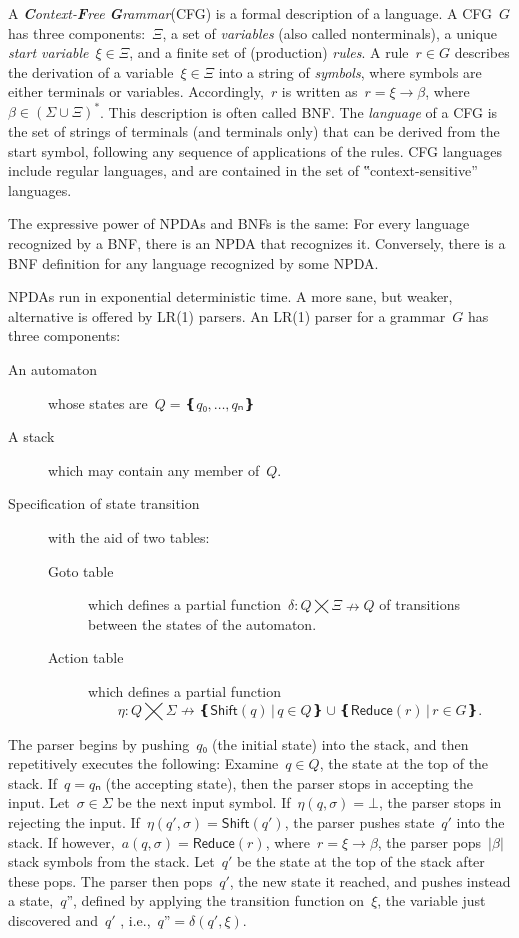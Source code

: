 A \emph{\textbf Context-\textbf Free \textbf Grammar}(CFG) is a formal description of a language.
A CFG~$G$ has three components:~$Ξ$,
a set of \emph{variables} (also called nonterminals), a unique \emph{start variable}~$ξ∈Ξ$, and
  a finite set of (production) \emph{rules}.
A rule~$r∈G$ describes the derivation of a variable~$ξ∈Ξ$ into
  a string of \emph{symbols}, where symbols are either terminals or variables.
Accordingly,~$r$ is written as~$r=ξ→β$, where~$β∈\left(Σ∪Ξ\right)^*$.
This description is often called BNF.
The \emph{language} of a CFG is the set of strings of terminals (and terminals only)
  that can be derived from the start symbol, following any sequence of applications of the rules.
CFG languages include regular languages, and are contained in the set
  of ‟context-sensitive” languages.

The expressive power of NPDAs and BNFs is the same: 
  For every language recognized by a BNF, there is an NPDA that recognizes it. 
Conversely, there is a BNF definition for any language recognized by some NPDA. 

NPDAs run in exponential deterministic time. 
A more sane, but weaker, alternative is offered by LR(1) parsers.  
An LR(1) parser for a grammar~$G$ has three components:
\begin{description}
  \item[An automaton] whose states are~$Q=❴q₀,…,qₙ❵$
  \item[A stack] which may contain any member of~$Q$.
  \item[Specification of state transition] with the aid of two tables:
        \begin{description}
          \item[Goto table] which defines a partial function~$δ:Q⨉Ξ↛Q$ of transitions
          between the states of the automaton.
          \item[Action table] which
            defines a partial function\[η:Q⨉Σ↛ ❴ \textsf{Shift}(q) \,|\, q∈Q❵ ∪ ❴\textsf{Reduce}(r) \,| \, r∈G❵.\]
        \end{description}
\end{description}
The parser begins by pushing~$q₀$ (the initial state) into the stack,
and then repetitively executes the following:
Examine~$q∈Q$, the state at the top of the stack.
If~$q=qₙ$ (the accepting state), then the parser stops in accepting the input.
Let~$σ∈Σ$ be the next input symbol.
If~$η(q,σ)=⊥$, the parser stops in rejecting the input.
If~$η(q',σ) = \textsf{Shift}(q')$, the parser pushes state~$q'$ into the stack.
If however,~$a(q,σ) = \textsf{Reduce}(r)$,
where~$r=ξ→β$,
the parser pops~$|β|$ stack symbols from the stack.
Let~$q'$ be the state at the top of the stack after these pops.
The parser then pops~$q'$, the new state it reached,
  and pushes instead a state,~$q”$, 
  defined by applying the transition function on~$ξ$, the variable just discovered and~$q'$ , i.e.,~$q”=δ(q',ξ)$.


